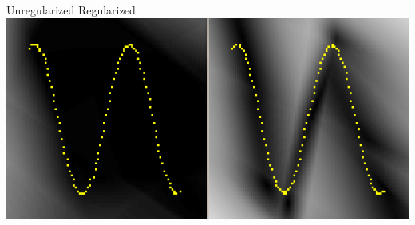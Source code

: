 \documentclass[paperwidth=38in,paperheight=28in,landscape,fontscale=0.4]{baposter}
\begin{document}
\begin{poster}
{
\begin{center}     
Unregularized \hspace{15mm} Regularized \\
\includegraphics[scale=0.4]{toy_shrink.png}\\
\end{center} 
}
 


\end{poster}
\end{document}
